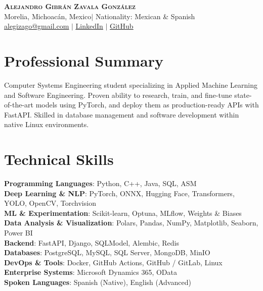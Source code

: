 \documentclass[letterpaper,11pt]{article}
\begin{document}
\begin{center}
    \textbf{\Huge \scshape Alejandro Gibrán Zavala González} \\ \vspace{2pt}
    \small Morelia, Michoacán, Mexico$|$ 
    Nationality: Mexican \& Spanish \\ \vspace{2pt}
    \href{mailto:alegizago@gmail.com}{\underline{alegizago@gmail.com}} $|$ 
    \href{https://www.linkedin.com/in/alejandro-gibr\%C3\%A1n-zavala-gonz\%C3\%A1lez-517384358/}{\underline{LinkedIn}} $|$
    \href{https://github.com/ingGibran}{\underline{GitHub}}
\end{center}

\section{Professional Summary}
Computer Systems Engineering student specializing in Applied Machine Learning and Software Engineering. Proven ability to research, train, and fine-tune state-of-the-art models using PyTorch, and deploy them as production-ready APIs with FastAPI. Skilled in database management and software development within native Linux environments.

\section{Technical Skills}
 \begin{itemize}[leftmargin=0.15in, label={}]
    \small{\item{
     \textbf{Programming Languages}{: Python, C++, Java, SQL, ASM} \\
     \textbf{Deep Learning \& NLP}{: PyTorch, ONNX, Hugging Face, Transformers, YOLO, OpenCV, Torchvision} \\
     \textbf{ML \& Experimentation}{: Scikit-learn, Optuna, MLflow, Weights \& Biases} \\
     \textbf{Data Analysis \& Visualization}{: Polars, Pandas, NumPy, Matplotlib, Seaborn, Power BI} \\
     \textbf{Backend}{: FastAPI, Django, SQLModel, Alembic, Redis} \\
     \textbf{Databases}{: PostgreSQL, MySQL, SQL Server, MongoDB, MinIO} \\
     \textbf{DevOps \& Tools}{: Docker, GitHub Actions, GitHub / GitLab, Linux} \\
     \textbf{Enterprise Systems}{: Microsoft Dynamics 365, OData} \\
     \textbf{Spoken Languages}{: Spanish (Native), English (Advanced)}
    }}
 \end{itemize}
\end{document}
